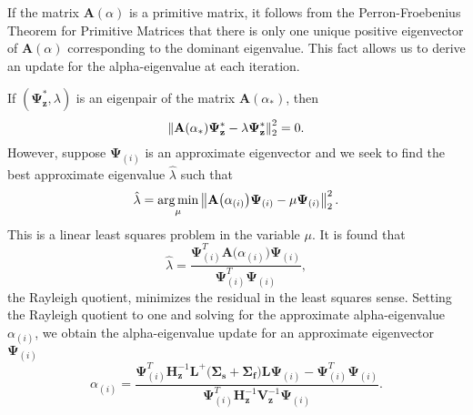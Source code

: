If the matrix $\mathbf{A}(\alpha)$ is a primitive matrix, it follows from the Perron-Froebenius Theorem for Primitive Matrices that there is only one unique positive eigenvector of $\mathbf{A}(\alpha)$ corresponding to the dominant eigenvalue. This fact allows us to derive an update for the alpha-eigenvalue at each iteration.

If $(\mathbf{\Psi_{z}^{*}}, \lambda)$ is an eigenpair of the matrix $\mathbf{A}(\alpha_{*})$, then
\begin{equation}
\left\lVert\mathbf{A}(\alpha_{*}) \mathbf{\Psi_{z}^{*}} - \lambda \mathbf{\Psi_{z}^{*}}\right\rVert_{2}^{2} = 0.
\end{equation}
However, suppose $\mathbf{\Psi}_{(i)}$ is an approximate eigenvector and we seek to find the best approximate eigenvalue $\hat{\lambda}$ such that
\begin{equation}
\hat{\lambda} = \operatorname*{arg\,min}_{\mu} \left\lVert\mathbf{A}\big (\alpha_{(i)} \big ) \mathbf{\Psi}_{(i)} - \mu \mathbf{\Psi}_{(i)}\right\rVert_{2}^{2}. 
\end{equation}
This is a linear least squares problem in the variable $\mu$. It is found that \cite{horn_matrix_2012}
\begin{equation}
	\hat{\lambda} = \frac{\mathbf{\Psi}^{T}_{(i)} \mathbf{A}\big (\alpha_{(i)} \big ) \mathbf{\Psi}_{(i)}}{\mathbf{\Psi}^{T}_{(i)} \mathbf{\Psi}_{(i)}},
\end{equation}
the Rayleigh quotient, minimizes the residual in the least squares sense. Setting the Rayleigh quotient to one and solving for the approximate alpha-eigenvalue $\alpha_{(i)}$, we obtain the alpha-eigenvalue update for an approximate eigenvector $\mathbf{\Psi}_{(i)}$
\begin{equation}
	\alpha_{(i)} = \frac{ \mathbf{\Psi}^{T}_{(i)} \mathbf{H}^{-1}_{\mathbf{z}} \mathbf{L}^{+} \big ( \mathbf{\Sigma_{s}} + \mathbf{\Sigma_{f}} \big ) \mathbf{L} \mathbf{\Psi}_{(i)} -  \mathbf{\Psi}^{T}_{(i)}  \mathbf{\Psi}_{(i)}}{  \mathbf{\Psi}^{T}_{(i)} \mathbf{H}^{-1}_{\mathbf{z}} \mathbf{V}^{-1}_{\mathbf{z}}  \mathbf{\Psi}_{(i)}}.
	\label{eq:AlphaUpdateTwoSweep}
\end{equation}

